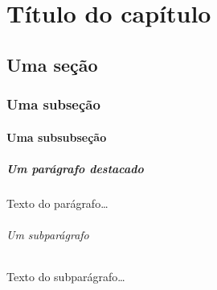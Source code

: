 \documentclass[a4paper]{report}
\begin{document}
\chapter{Título do capítulo}
\section{Uma seção}
\subsection{Uma subseção}
\subsubsection{Uma subsubseção}
\paragraph{Um parágrafo destacado} Texto do parágrafo\ldots
\subparagraph{Um subparágrafo} Texto do subparágrafo\ldots
\end{document}
